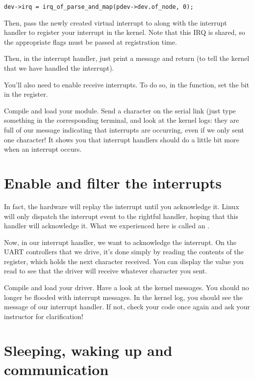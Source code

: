 \begin{verbatim}
dev->irq = irq_of_parse_and_map(pdev->dev.of_node, 0);
\end{verbatim}

Then, pass the newly created virtual interrupt to 
along with the interrupt handler to register your interrupt in the
kernel. Note that this IRQ is shared, so the appropriate flags must be
passed at registration time.

Then, in the interrupt handler, just print a message and return
 (to tell the kernel that we have handled the
interrupt).

You'll also need to enable receive interrupts.
To do so, in the  function, set the
 bit in the  register.

Compile and load your module. Send a character on the serial link (just
type something in the corresponding  terminal, and
look at the kernel logs: they are full of our message indicating that
interrupts are occurring, even if we only sent one character! It shows
you that interrupt handlers should do a little bit more when an
interrupt occurs.

\section{Enable and filter the interrupts}

In fact, the hardware will replay the interrupt until you acknowledge
it. Linux will only dispatch the interrupt event to the rightful
handler, hoping that this handler will acknowledge it. What we
experienced here is called an .

Now, in our interrupt handler, we want to acknowledge the
interrupt. On the UART controllers that we drive, it's done simply by
reading the contents of the  register, which holds the
next character received. You can display the value you read to see
that the driver will receive whatever character you sent.

Compile and load your driver. Have a look at the kernel messages. You
should no longer be flooded with interrupt messages. In the kernel
log, you should see the message of our interrupt handler. If not,
check your code once again and ask your instructor for clarification!

\section{Sleeping, waking up and communication}

